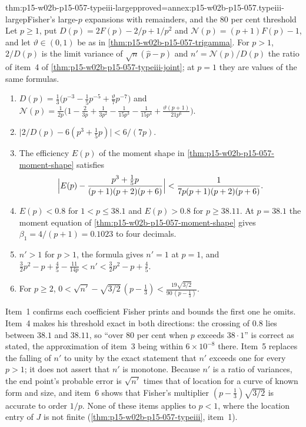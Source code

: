\begin{hbtheorem}{thm:p15-w02b-p15-057-typeiii-largep}{proved=annex:p15-w02b-p15-057.typeiii-largep}{Fisher's large-\(p\) expansions with remainders, and the 80 per cent threshold}
Let \(p\geq1\), put \(D(p)=2F(p)-2/p+1/p^2\) and \(\mathcal N(p)=(p+1)F(p)-1\), and
let \(\vartheta\in(0,1)\) be as in \cref{thm:p15-w02b-p15-057-trigamma}.
For \(p>1\), \(2/D(p)\) is the limit variance of \(\sqrt n(\hat p-p)\) and
\(n'=\mathcal N(p)/D(p)\) the ratio of item~4 of
\cref{thm:p15-w02b-p15-057-typeiii-joint}; at \(p=1\) they are values of
the same formulas.
\begin{enumerate}
\item \(D(p)=\frac13\bigl(p^{-3}-\frac15p^{-5}+\frac{\vartheta}{7}p^{-7}\bigr)\)
 and
 \(\mathcal N(p)=\frac1{2p}\bigl(1-\frac2{3p}+\frac1{3p^2}-\frac1{15p^3}
 -\frac1{15p^4}+\frac{\vartheta(p+1)}{21p^6}\bigr)\).
\item \(\bigl|2/D(p)-6(p^3+\tfrac15p)\bigr|<6/(7p)\).
\item The efficiency \(E(p)\) of the moment shape in
 \cref{thm:p15-w02b-p15-057-moment-shape} satisfies
 \[
  \Bigl|E(p)-\frac{p^3+\frac15p}{(p+1)(p+2)(p+6)}\Bigr|
  <\frac1{7p(p+1)(p+2)(p+6)} .
 \]
\item \(E(p)<0.8\) for \(1<p\leq38.1\) and \(E(p)>0.8\) for
 \(p\geq38.11\). At \(p=38.1\) the moment equation of
 \cref{thm:p15-w02b-p15-057-moment-shape} gives
 \(\beta_1=4/(p+1)=0.1023\) to four decimals.
\item \(n'>1\) for \(p>1\), the formula gives \(n'=1\) at \(p=1\), and
 \(\tfrac32p^2-p+\tfrac45-\tfrac{11}{14p}<n'<\tfrac32p^2-p+\tfrac45\).
\item For \(p\geq2\),
 \(0<\sqrt{n'}-\sqrt{3/2}\,(p-\tfrac13)<
 \frac{19\sqrt{3/2}}{90\,(p-\frac13)}\).
\end{enumerate}
\end{hbtheorem}

Item~1 confirms each coefficient Fisher prints and bounds the first one he
omits. Item~4 makes his threshold exact in both directions: the crossing
of \(0.8\) lies between \(38.1\) and \(38.11\), so ``over 80 per cent when
\(p\) exceeds \(38{\cdot}1\)'' is correct as stated, the approximation of
item~3 being within \(6\times10^{-8}\) there. Item~5 replaces the falling
of \(n'\) to unity by the exact statement that \(n'\) exceeds one for every
\(p>1\); it does not assert that \(n'\) is monotone. Because \(n'\) is a
ratio of variances, the end point's probable error is \(\sqrt{n'}\) times
that of location for a curve of known form and size, and item~6 shows
that Fisher's multiplier \((p-\frac13)\sqrt{3/2}\) is accurate to order
\(1/p\). None of these items applies to \(p<1\), where the location entry
of \(J\) is not finite (\cref{thm:p15-w02b-p15-057-typeiii}, item~1).

